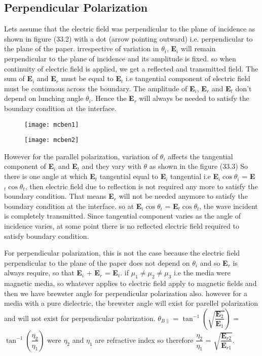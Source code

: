 \subsection{Perpendicular Polarization}
Lets assume that the electric field was perpendicular to the plane of incidence as shown in figure (33.2) with a dot (arrow pointing outward) i.e. perpendicular to the plane of the paper. irrespective of variation in $\theta_i$, \textbf{E}$_i$ will remain perpendicular to the plane of incidence and its amplitude is fixed. so when continuity of electric field is applied, we get a reflected and transmitted field. The sum of \textbf{E}$_i$ and \textbf{E}$_r$ must be equal to \textbf{E}$_t$ i.e tangential component of electric field must be continuous across the boundary. The amplitude of \textbf{E}$_i$, \textbf{E}$_r$ and \textbf{E}$_t$ don't depend on lunching angle $\theta_i$. Hence the \textbf{E}$_r$ will always be needed to satisfy the boundary condition at the interface.
\begin{figure}
\centering
\texttt{[image: mcben1]}
\caption{}
\label{fig:mcben1}
\end{figure}
\begin{figure}
\centering
\texttt{[image: mcben2]}
\caption{}
\label{fig:mcben2}
\end{figure}	
However for the parallel polarization, variation of $\theta_i$ affects the tangential component of \textbf{E}$_i$ and \textbf{E}$_t$ and they vary with $\theta$ as shown in the figure (33.3) So there is one angle at which \textbf{E}$_t$ tangential equal to \textbf{E}$_i$ tangential i.e \textbf{E}$_i\cos\theta_i$ = \textbf{E}$_t\cos\theta_t$, then electric field due to reflection is not required any more to satisfy the boundary condition. That means \textbf{E}$_r$ will not be needed anymore to satisfy the boundary condition at the interface. so at \textbf{E}$_i\cos\theta_i$ = \textbf{E}$_t\cos\theta_t$, the wave incident is completely transmitted. Since tangential component varies as the angle of incidence varies, at some point there is no reflected electric field required to satisfy boundary condition.

For perpendicular polarization, this is not the case because the electric field perpendicular to the plane of the paper does not depend on $\theta_i$ and so \textbf{E}$_r$ is always require, so that \textbf{E}$_i$ + \textbf{E}$_r$ = \textbf{E}$_t$. if $\mu_1 \neq \mu_2 \neq \mu_3$ i.e the media were magnetic media, so whatever applies to electric field apply to magnetic fields and then we have brewster angle for perpendicular polarization also. however for a media with a pure dielectric, the brewster angle will exist for parellel polarization and will not exist for perpendicular polarization. $\theta_{B\parallel}$ = $\tan^{-1}(\sqrt{\dfrac{\textbf{E}_2}{\textbf{E}_1}})$ = $\tan^{-1}(\dfrac{\eta_2}{\eta_1})$ were $\eta_2$ and $\eta_1$ are refractive index so therefore $\dfrac{\eta_2}{\eta_1}$ = $\sqrt{\dfrac{\textbf{E}_{r2}}{\textbf{E}_{r1}}}$.

